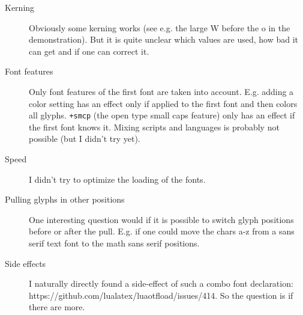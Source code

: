 \documentclass[parskip=half-,egregdoesnotlikesansseriftitles]{scrartcl}
\begin{document}
\begin{description}
  \item[Kerning] Obviously some kerning works (see e.g. the large W before the o in the demonstration). But it is quite unclear which values are used, how bad it can get and if one can correct it.
  \item[Font features] Only font features of the first font are taken into account. E.g. adding a color setting has an effect only if applied to the first font and then colors all glyphs. \verb!+smcp! (the open type small caps feature) only has an effect if the first font knows it. Mixing scripts and languages is probably not possible (but I didn't try yet).
  \item[Speed] I didn't try to optimize the loading of the fonts.
  \item[Pulling glyphs in other positions] One interesting question would if it is possible to switch glyph positions before or after the pull. E.g. if one could move the chars a-z from a sans serif text font to the math sans serif positions.
  \item[Side effects] I naturally directly found a side-effect of such a combo font declaration: https://github.com/lualatex/luaotfload/issues/414. So the question is if there are more.
\end{description}
\end{document}
